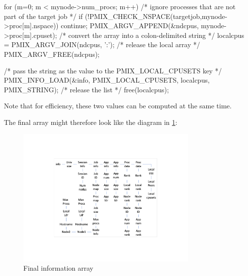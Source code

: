 \begin{itemize}
\begin{codepar}
for (m=0; m < mynode->num_procs; m++) {
    /* ignore processes that are not part of the target job */
    if (!PMIX_CHECK_NSPACE(targetjob,mynode->proc[m].nspace)) {
        continue;
    }
    PMIX_ARGV_APPEND(&ndcpus, mynode->proc[m].cpuset);
}
/* convert the array into a colon-delimited string */
localcpus = PMIX_ARGV_JOIN(ndcpus, ':');
/* release the local array */
PMIX_ARGV_FREE(ndcpus);

/* pass the string as the value to the PMIX_LOCAL_CPUSETS key */
PMIX_INFO_LOAD(&info, PMIX_LOCAL_CPUSETS, localcpus, PMIX_STRING);
/* release the list */
free(localcpus);

\end{codepar}
\cspecificend

Note that for efficiency, these two values can be computed at the same time.

\end{itemize}

The final  array might therefore look like the diagram in \ref{fig:nodeinfo}:

\begingroup
\begin{figure}[ht!]
  \begin{center}
    \includegraphics[clip,width=0.8\textwidth]{figs/nodeinfo.pdf}
  \end{center}
  \caption{Final information array}
  \label{fig:nodeinfo}
\end{figure}
\endgroup


\subsection{}


